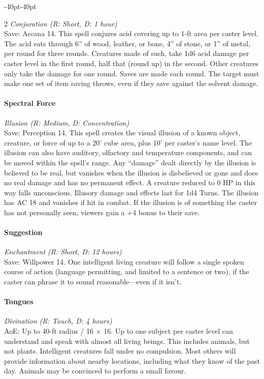 \documentclass{book}
\begin{document}
\begin{adjustwidth}{-40pt}{-40pt}
\begin{multicols}{2}
\emph{Conjuration (R: Short, D: 1 hour)}\\
Save: Arcana 14. This spell conjures acid covering up to 1-ft area per
caster level. The acid eats through 6'' of wood, leather, or bone, 4''
of stone, or 1'' of metal, per round for three rounds. Creatures made of
such, take 1d6 acid damage per caster level in the first round, half
that (round up) in the second. Other creatures only take the damage for
one round. Saves are made each round. The target must make one set of
item saving throws, even if they save against the solvent damage.

\paragraph{Spectral Force}\label{spectral-force}

\emph{Illusion (R: Medium, D: Concentration)}\\
Save: Perception 14. This spell creates the visual illusion of a known
object, creature, or force of up to a 20' cube area, plus 10' per
caster's name level. The illusion can also have auditory, olfactory and
temperature components, and can be moved within the spell's range. Any
``damage'' dealt directly by the illusion is believed to be real, but
vanishes when the illusion is disbelieved or gone and does no real
damage and has no permanent effect. A creature reduced to 0 HP in this
way falls unconscious. Illusory damage and effects last for 1d4 Turns.
The illusion has AC 18 and vanishes if hit in combat. If the illusion is
of something the caster has not personally seen, viewers gain a +4 bonus
to their save.

\paragraph{Suggestion}\label{suggestion}

\emph{Enchantment (R: Short, D: 12 hours)}\\
Save: Willpower 14. One intelligent living creature will follow a single
spoken course of action (language permitting, and limited to a sentence
or two), if the caster can phrase it to sound reasonable---even if it
isn't.

\paragraph{Tongues}\label{tongues}

\emph{Divination (R: Touch, D: 4 hours)}\\
AoE: Up to 40-ft radius / 16 × 16. Up to one subject per caster level
can understand and speak with almost all living beings. This includes
animals, but not plants. Intelligent creatures fall under no compulsion.
Most others will provide information about nearby locations, including
what they know of the past day. Animals may be convinced to perform a
small favour.


\end{multicols}
\end{adjustwidth}
\end{document}

